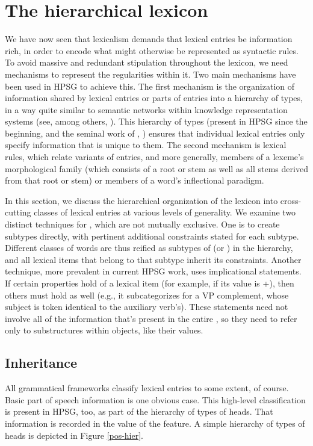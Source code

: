 \documentclass[output=paper]{langsci/langscibook}
\begin{document}
\section{The hierarchical lexicon}
\label{sec:hier-lex}


We have now seen that lexicalism demands that lexical entries be information rich, in order to encode what might otherwise be represented as syntactic rules.
To avoid massive and redundant stipulation throughout the lexicon, we need mechanisms to represent the regularities within it. Two main mechanisms have been used in HPSG to achieve this. The first mechanism is the organization of information shared by lexical entries or parts of entries into a hierarchy of types, in a way quite similar to semantic networks within knowledge representation systems (see, among others, \citealt{BrachmanandSchmolze1985}). This hierarchy of types (present in HPSG since the beginning, \citet{PollardandSag1987} and the seminal work of  \citet{Flickingeretal1985}, \citealt{Flickinger1987}) ensures that individual lexical entries only specify information that is unique to them. The second mechanism is lexical rules, which relate variants of entries, and more generally, members of a lexeme's morphological family (which consists of a root or stem as well as all stems derived from that root or stem) or members of a word's inflectional paradigm.     

In this section, we discuss the hierarchical organization of the lexicon into cross-cutting classes of lexical entries at various levels of generality.
We examine two distinct techniques for , which are not mutually exclusive.
One is to create subtypes directly, with pertinent additional constraints stated for each subtype.
Different classes of words are thus reified as subtypes of  (or ) in the hierarchy, and all lexical items that belong to that subtype inherit its constraints.
Another technique, more prevalent in current HPSG work, uses implicational statements.
If certain properties hold of a lexical item (for example, if its  value is +), then others must hold as well (e.g., it subcategorizes for a VP complement, whose subject is token identical to the auxiliary verb's).
These statements need not involve all of the information that's present in the entire , so they need to refer only to substructures within  objects, like their  values.


\subsection{Inheritance}
All grammatical frameworks classify lexical entries to some extent, of course.
Basic part of speech information is one obvious case.
This high-level classification is present in HPSG, too, as part of the hierarchy of types of heads. That information is recorded in the value of the  feature. A simple hierarchy of types of heads is depicted in Figure \ref{pos-hier}.
\end{document}

